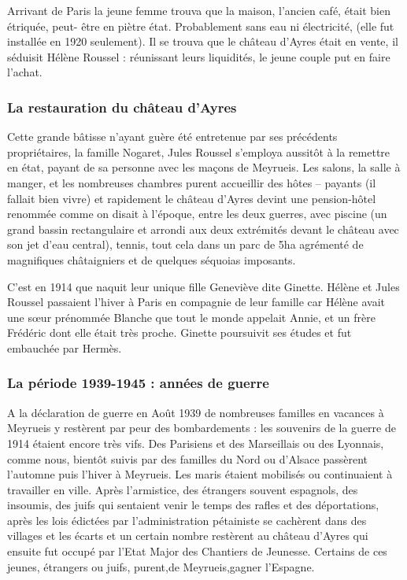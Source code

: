 \medskip

Arrivant de Paris la jeune femme trouva que la maison, l’ancien café, était bien étriquée, peut-
être en piètre état. Probablement sans eau ni électricité, (elle fut installée en 1920 seulement).
Il se trouva que le château d’Ayres était en vente, il séduisit Hélène Roussel : réunissant leurs
liquidités, le jeune couple put en faire l’achat.

\medskip

\subsubsection{La restauration du château d’Ayres}

\medskip

Cette grande bâtisse n’ayant guère été entretenue par ses précédents propriétaires, la famille
Nogaret, Jules Roussel s’employa aussitôt à la remettre en état, payant de sa personne avec
les maçons de Meyrueis. Les salons, la salle à manger, et les nombreuses chambres purent
accueillir des hôtes – payants (il fallait bien vivre) et rapidement le château d’Ayres devint
une pension-hôtel renommée comme on disait à l’époque, entre les deux guerres, avec
piscine (un grand bassin rectangulaire et arrondi aux deux extrémités devant le château avec
son jet d’eau central), tennis, tout cela dans un parc de 5ha agrémenté de magnifiques
châtaigniers et de quelques séquoias imposants.

C’est en 1914 que naquit leur unique fille Geneviève dite Ginette. Hélène et Jules Roussel
passaient l’hiver à Paris en compagnie de leur famille car Hélène avait une sœur prénommée
Blanche que tout le monde appelait Annie, et un frère Frédéric dont elle était très proche.
Ginette poursuivit ses études et fut embauchée par Hermès.

\medskip

\subsubsection{La période 1939-1945 : années de guerre}

\medskip

A la déclaration de guerre en Août 1939 de nombreuses familles en vacances à Meyrueis y
restèrent par peur des bombardements : les souvenirs de la guerre de 1914 étaient encore très
vifs. Des Parisiens et des Marseillais ou des Lyonnais, comme nous, bientôt suivis par des
familles du Nord ou d’Alsace passèrent l’automne puis l’hiver à Meyrueis. Les maris étaient
mobilisés ou continuaient à travailler en ville. Après l’armistice, des étrangers souvent
espagnols, des insoumis, des juifs qui sentaient venir le temps des rafles et des déportations,
après les lois édictées par l’administration pétainiste se cachèrent dans des villages et les écarts
et un certain nombre restèrent au château d’Ayres qui ensuite fut occupé par l’Etat Major des
Chantiers de Jeunesse. Certains de ces jeunes, étrangers ou juifs, purent,de Meyrueis,gagner
l’Espagne.

